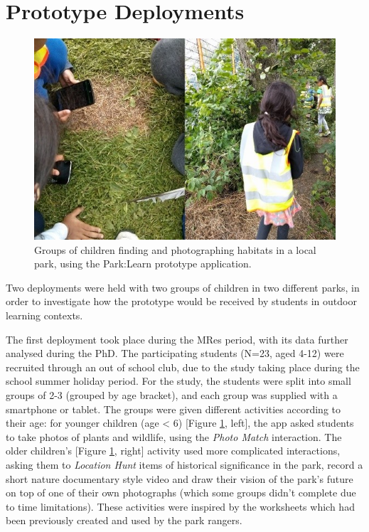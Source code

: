 \section{Prototype Deployments}

\begin{figure}
  \centering
  \includegraphics[width=0.8\columnwidth]{images/chapter04/prototypeDeployment.jpg}
  \caption[Children during the Park:Learn summer school deployment]{Groups of children finding and photographing habitats in a local park, using the Park:Learn prototype application.}
  \label{fig:prototypeDeployment}
\end{figure}

Two deployments were held with two groups of children in two different parks, in order to investigate how the prototype would be received by students in outdoor learning contexts.

The first deployment took place during the MRes period, with its data further analysed during the PhD. The participating students (N=23, aged 4-12) were recruited through an out of school club, due to the study taking place during the school summer holiday period. For the study, the students were split into small groups of 2-3 (grouped by age bracket), and each group was supplied with a smartphone or tablet. The groups were given different activities according to their age: for younger children (age < 6) [Figure \ref{fig:prototypeDeployment}, left], the app asked students to take photos of plants and wildlife, using the \textit{Photo Match} interaction. The older children's [Figure \ref{fig:prototypeDeployment}, right] activity used more complicated interactions, asking them to \textit{Location Hunt} items of historical significance in the park, record a short nature documentary style video and draw their vision of the park’s future on top of one of their own photographs (which some groups didn’t complete due to time limitations). These activities were inspired by the worksheets which had been previously created and used by the park rangers.

